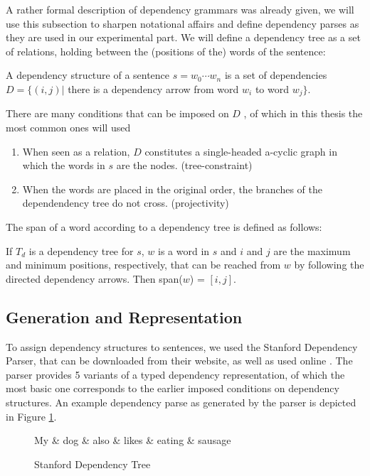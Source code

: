 \documentclass{report}
\begin{document}
A rather formal description of dependency grammars was already given, we will use this subsection to sharpen notational affairs and define dependency parses as they are used in our experimental part. We will define a dependency tree as a set of relations, holding between the (positions of the) words of the sentence:

\begin{definition}
A dependency structure of a sentence $s = w_0\cdots w_n$ is a set of dependencies $D = \{ (i,j) |$ there is a dependency arrow from word $w_i$ to word $w_j \}$. 
\end{definition}

There are many conditions that can be imposed on $D$ \citep{de2006generating}, of which in this thesis the most common ones will used\begin{enumerate}
\item When seen as a relation, $D$ constitutes a single-headed a-cyclic graph in which the words in $s$ are the nodes. (tree-constraint)
\item When the words are placed in the original order, the branches of the dependendency tree do not cross. (projectivity)
\end{enumerate}

The span of a word according to a dependency tree is defined as follows:

\begin{definition}
If $T_d$ is a dependency tree for $s$, $w$ is a word in $s$ and $i$ and $j$ are the maximum and minimum positions, respectively, that can be reached from $w$ by following the directed dependency arrows. Then span($w$) = $[i,j]$. 
\end{definition}

\subsection{Generation and Representation}

To assign dependency structures to sentences, we used the Stanford Dependency Parser, that can be downloaded from their website, as well as used online  \citep{de2006generating}. The parser provides 5 variants of a typed dependency representation, of which the most basic one corresponds to the earlier imposed conditions on dependency structures. An example dependency parse as generated by the parser is depicted in Figure \ref{fig:deptree1}.

\begin{figure}[!h]\label{fig:deptree1}
\centering
\begin{dependency}[theme=simple]%
\begin{deptext}[column sep=.5cm, row sep=.1ex]
My \& dog \& also \& likes \& eating \& sausage \\
\end{deptext}
\end{dependency}
\caption{Stanford Dependency Tree}
\end{figure}
\end{document}
